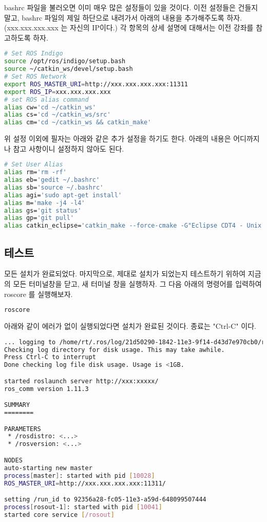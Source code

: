 bashrc 파일을 불러오면 이미 매우 많은 설정들이 있을 것이다. 이전 설정들은 건들지 말고, bashrc 파일의 제일 하단으로 내려가서 아래의 내용을 추가해주도록 하자. (xxx.xxx.xxx.xxx 는 자신의 IP이다.) 각 항목의 상세 설명에 대해서는 이전 강좌를 참고하도록 하자.

\begin{lstlisting}[language=bash]
# Set ROS Indigo
source /opt/ros/indigo/setup.bash
source ~/catkin_ws/devel/setup.bash
# Set ROS Network
export ROS_MASTER_URI=http://xxx.xxx.xxx.xxx:11311
export ROS_IP=xxx.xxx.xxx.xxx
# set ROS alias command
alias cw='cd ~/catkin_ws'
alias cs='cd ~/catkin_ws/src'
alias cm='cd ~/catkin_ws && catkin_make'
\end{lstlisting}

위 설정 이외에 필자는 아래와 같은 추가 설정을 하기도 한다. 아래의 내용은 어디까지나 참고 사항이니 설정하지 않아도 된다.

\begin{lstlisting}[language=bash]
# Set User Alias
alias rm='rm -rf' 
alias eb='gedit ~/.bashrc' 
alias sb='source ~/.bashrc'
alias agi='sudo apt-get install'  
alias m='make -j4 -l4'  
alias gs='git status'  
alias gp='git pull'
alias catkin_eclipse='catkin_make --force-cmake -G"Eclipse CDT4 - Unix Makefiles"'
\end{lstlisting}

\subsection{테스트}

모든 설치가 완료되었다. 마지막으로, 제대로 설치가 되었는지 테스트하기 위하여 지금의 모든 터미널창을 닫고, 새 터미널 창을 실행하자. 그 다음 아래의 명령어를 입력하여 roscore 를 실행해보자.

\begin{lstlisting}[language=bash]
roscore
\end{lstlisting}

\noindent
아래와 같이 에러가 없이 실행되었다면 설치가 완료된 것이다. 종료는 "Ctrl-C" 이다.

\begin{lstlisting}[language=bash]
... logging to /home/rt/.ros/log/21d50290-1842-11e3-9f14-d43d7e970cb0/roslaunch-rt-5461.log
Checking log directory for disk usage. This may take awhile.
Press Ctrl-C to interrupt
Done checking log file disk usage. Usage is <1GB.

started roslaunch server http://xxx:xxxxx/
ros_comm version 1.11.3

SUMMARY
========

PARAMETERS
 * /rosdistro: <...>
 * /rosversion: <...>

NODES
auto-starting new master
process[master]: started with pid [10028]
ROS_MASTER_URI=http://xxx.xxx.xxx.xxx:11311/

setting /run_id to 92356a28-fc05-11e3-a59d-648099507444
process[rosout-1]: started with pid [10041]
started core service [/rosout]
\end{lstlisting}


